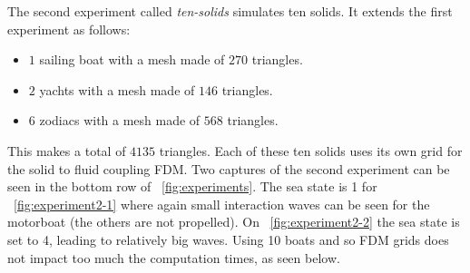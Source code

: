 \documentclass[11pt]{article}
\begin{document}
The second experiment called \emph{ten-solids} simulates ten solids.
It extends the first experiment as follows:
\begin{itemize}
	\item $1$ sailing boat with a mesh made of $270$ triangles.
	\item $2$ yachts with a mesh made of $146$ triangles.
	\item $6$ zodiacs with a mesh made of $568$ triangles.
\end{itemize}
This makes a total of $4135$ triangles.
Each of these ten solids uses its own grid for the solid to fluid coupling FDM.
Two captures of the second experiment can be seen in the bottom row of \figurename~\ref{fig:experiments}.
The sea state is 1 for \figurename~\ref{fig:experiment2-1} where again small interaction waves can be seen for the motorboat (the others are not propelled).
On \figurename~\ref{fig:experiment2-2} the sea state is set to 4, leading to relatively big waves.
Using 10 boats and so FDM grids does not impact too much the computation times, as seen below.
\end{document}
